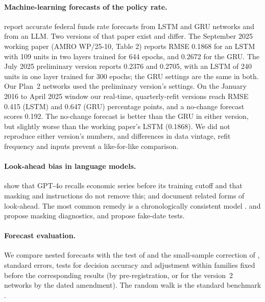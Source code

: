 \documentclass[11pt]{article}
\begin{document}
\paragraph{Machine-learning forecasts of the policy rate.}
\citet{chanlau2025} report accurate federal funds rate forecasts from LSTM and GRU networks and from an LLM.
Two versions of that paper exist and differ. The September 2025 working paper (AMRO WP/25-10, Table 2) reports
RMSE 0.1868 for an LSTM with 109 units in two layers trained for 644 epochs, and 0.2672 for the GRU. The July 2025
preliminary version \citep{chanlau2025prelim} reports 0.2376 and 0.2705, with an LSTM of 240 units in one layer
trained for 300 epochs; the GRU settings are the same in both. Our Plan~2 networks used the preliminary version's
settings. On the January 2016 to April 2025 window our real-time, quarterly-refit versions reach RMSE 0.415 (LSTM)
and 0.647 (GRU) percentage points, and a no-change forecast scores 0.192. The no-change forecast is better than the
GRU in either version, but slightly worse than the working paper's LSTM (0.1868). We did not reproduce either
version's numbers, and differences in data vintage, refit frequency and inputs prevent a like-for-like comparison.

\paragraph{Look-ahead bias in language models.}
\citet{lopezlira2025} show that GPT-4o recalls economic series before its training cutoff and that masking and
instructions do not remove this; \citet{sarkar2024} and \citet{crane2025} document related forms of look-ahead.
The most common remedy is a chronologically consistent model \citep{he2025}. \citet{glasserman2023} and
\citet{engelberg2025} propose masking diagnostics, and \citet{eliseev2026} propose fake-date tests.

\paragraph{Forecast evaluation.}
We compare nested forecasts with the test of \citet{diebold1995} and the small-sample correction of
\citet{hln1997}, \citet{newey1987} standard errors, \citet{mcnemar1947} tests for decision accuracy and
\citet{holm1979} adjustment within families fixed before the corresponding results (by pre-registration, or for
the version~2 networks by the dated amendment). The random walk is the standard benchmark
\citep{meese1983}.
\end{document}
